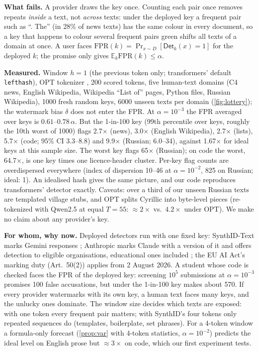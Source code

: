 \documentclass{article}
\theoremstyle{plain}
\newcommand{\FPR}{\mathrm{FPR}}
\newcommand{\E}{\mathbb{E}}
\begin{document}
\textbf{What fails.} A provider draws the key once. Counting each pair once removes repeats \emph{inside} a text, not \emph{across} texts: under the deployed key a frequent pair such as ``. The'' (in 28\% of news texts) has the same colour in every document, so a key that happens to colour several frequent pairs green shifts all texts of a domain at once. A user faces $\FPR(k)=\Pr_{x\sim D}[\mathsf{Det}_k(x)=1]$ for the deployed $k$; the promise only gives $\E_k\FPR(k)\le\alpha$.

\textbf{Measured.} Window \mbox{$h=1$} (the previous token only; transformers' default \texttt{lefthash}), OPT tokenizer \citep{zhang2022opt}, 200 scored tokens, five human-text domains (C4 news, English Wikipedia, Wikipedia ``List of'' pages, Python files, Russian Wikipedia), 1000 fresh random keys, 6000 unseen texts per domain (\cref{fig:lottery}); the watermark bias $\delta$ does not enter the FPR. At $\alpha=10^{-3}$ the FPR averaged over keys is $0.61$--$0.78\,\alpha$. But the 1-in-100 key (99th percentile over keys, roughly the 10th worst of 1000) flags 2.7$\times$ (news), 3.0$\times$ (English Wikipedia), 2.7$\times$ (lists), 5.7$\times$ (code; 95\% CI 3.3--8.8) and 9.9$\times$ (Russian; 6.0--34), against 1.67$\times$ for ideal keys at this sample size. The worst key flags 65$\times$ (Russian); on code the worst, 64.7$\times$, is one key times one licence-header cluster. Per-key flag counts are overdispersed everywhere (index of dispersion 10--46 at $\alpha=10^{-2}$, 825 on Russian; ideal: 1). An idealised hash gives the same picture, and our code reproduces transformers' detector exactly. Caveats: over a third of our unseen Russian texts are templated village stubs, and OPT splits Cyrillic into byte-level pieces (re-tokenized with Qwen2.5 at equal $T{=}55$: ${\approx}2\times$ vs.\ $4.2\times$ under OPT). We make no claim about any provider's key.

\textbf{For whom, why now.} Deployed detectors run with one fixed key: SynthID-Text marks Gemini responses \citep{dathathri2024scalable}; Anthropic marks Claude with a version of it and offers detection to eligible organisations, educational ones included \citep{anthropic2026watermark}; the EU AI Act's marking duty (Art.~50(2)) applies from 2 August 2026. A student whose code is checked faces the FPR of the deployed key: screening $10^5$ submissions at $\alpha=10^{-3}$ promises 100 false accusations, but under the 1-in-100 key makes about 570. If every provider watermarks with its own key, a human text faces many keys, and the unlucky ones dominate. The window size decides which texts are exposed: with one token every frequent pair matters; with SynthID's four tokens only repeated sequences do (templates, boilerplate, set phrases). For a 4-token window a formula-only forecast (\cref{prop:var} with 4-token statistics, $\alpha=10^{-2}$) predicts the ideal level on English prose but ${\approx}3\times$ on code, which our first experiment tests.
\end{document}

